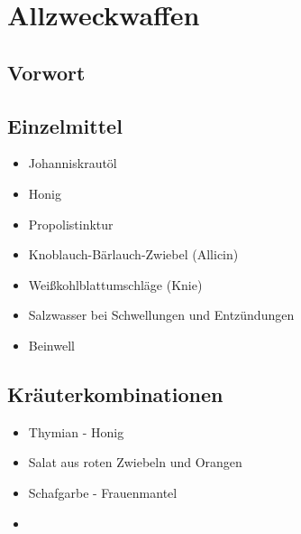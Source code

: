 \chapter{Allzweckwaffen}


\section{Vorwort}

\newpage


\section{Einzelmittel}

\begin{itemize}
	\item Johanniskrautöl
	\item Honig
	\item Propolistinktur
	\item Knoblauch-Bärlauch-Zwiebel (Allicin)
	\item Weißkohlblattumschläge (Knie)
	\item Salzwasser bei Schwellungen und Entzündungen
	\item Beinwell
\end{itemize}





\section{Kräuterkombinationen}

\begin{itemize}
	\item Thymian - Honig
	\item Salat aus roten Zwiebeln und Orangen
	\item Schafgarbe - Frauenmantel
	\item 
\end{itemize}